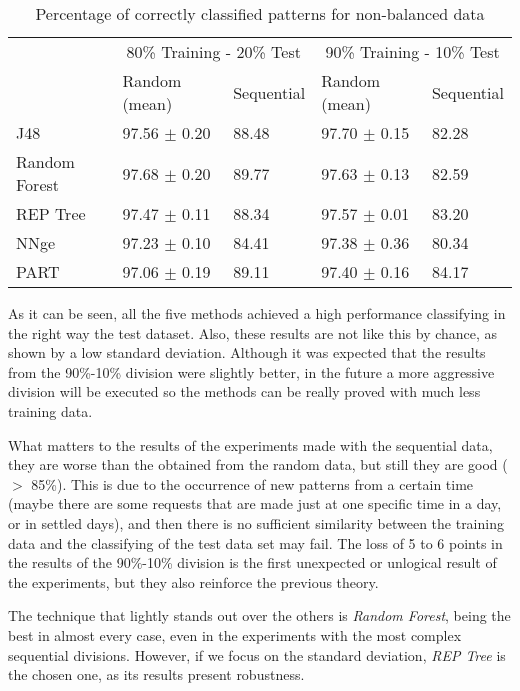 \documentclass{llncs}
\begin{document}
\begin{table*}[htpb]
\centering
 \caption{\label{tabresults_nobalan} Percentage of correctly classified patterns for non-balanced data}
{\small
\begin{tabular}{|l|l|l|l|l|}
\cline{2-5}
\multicolumn{1}{l|}{} & \multicolumn{2}{c|}{80\% Training - 20\% Test} & \multicolumn{2}{c|}{90\% Training - 10\% Test} \\ 
\cline{2-5}
\multicolumn{1}{l|}{} & Random (mean) & Sequential & Random (mean) & Sequential \\ 
\hline
J48 & 97.56 $\pm$ 0.20 & 88.48 & 97.70 $\pm$ 0.15 & 82.28 \\ 
\cline{1-1}
Random Forest & 97.68 $\pm$ 0.20 & 89.77 & 97.63 $\pm$ 0.13 & 82.59 \\ 
\cline{1-1}
REP Tree & 97.47 $\pm$ 0.11 & 88.34 & 97.57 $\pm$ 0.01 & 83.20 \\ 
\cline{1-1}
NNge & 97.23 $\pm$ 0.10 & 84.41 & 97.38 $\pm$ 0.36 & 80.34 \\ 
\cline{1-1}
PART & 97.06 $\pm$ 0.19 & 89.11 & 97.40 $\pm$ 0.16 & 84.17 \\ 
\hline
\end{tabular}
}
\end{table*}
 
As it can be seen, all the five methods achieved a high performance classifying in the right way the test dataset. Also, these results are not like this by chance, as shown by a low standard deviation. Although it was expected that the results from the 90\%-10\% division were slightly better, in the future a more aggressive division will be executed so the methods can be really proved with much less training data.

What matters to the results of the experiments made with the sequential data, they are worse than the obtained from the random data, but still they are good ($>$ 85\%). This is due to the occurrence of new patterns from a certain time (maybe there are some requests that are made just at one specific time in a day, or in settled days), and then there is no sufficient similarity between the training data and the classifying of the test data set may fail. The loss of 5 to 6 points in the results of the 90\%-10\% division is the first unexpected or unlogical result of the experiments, but they also reinforce the previous theory.

The technique that lightly stands out over the others is
\textit{Random Forest}, being the best in almost every case, even in
the experiments with the most complex sequential divisions. However,
if we focus on the standard deviation, \textit{REP Tree} is the chosen
one, as its results present robustness. 
\end{document}

